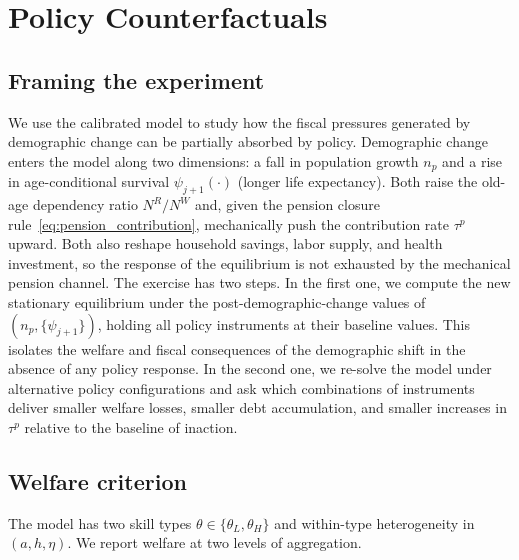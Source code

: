 \documentclass[12pt,a4paper]{article}
\begin{document}
\section{Policy Counterfactuals}
\label{sec:policy}

\subsection{Framing the experiment}
\label{subsec:policy_framing}
 
We use the calibrated model to study how the fiscal pressures generated by demographic change can be partially absorbed by policy. Demographic change enters the model along two dimensions: a fall in population growth $n_p$ and a rise in age-conditional survival $\psi_{j+1}(\cdot)$ (longer life expectancy). Both raise the old-age dependency ratio $N^R/N^W$ and, given the pension closure rule~\eqref{eq:pension_contribution}, mechanically push the contribution rate $\tau^p$ upward. Both also reshape household savings, labor supply, and health investment, so the response of the equilibrium is not exhausted by the mechanical pension channel. The exercise has two steps. In the first one, we compute the new stationary equilibrium under the post-demographic-change values of $(n_p, \{\psi_{j+1}\})$, holding all policy instruments at their baseline values. This isolates the welfare and fiscal consequences of the demographic shift in the absence of any policy response. In the second one, we re-solve the model under alternative policy configurations and ask which combinations of instruments deliver smaller welfare losses, smaller debt accumulation, and smaller increases in $\tau^p$ relative to the baseline of inaction.
 
\subsection{Welfare criterion}
\label{subsec:policy_welfare}
The model has two skill types $\theta \in \{\theta_L, \theta_H\}$ and within-type heterogeneity in $(a, h, \eta)$. We report welfare at two levels of aggregation.
 
\end{document}
